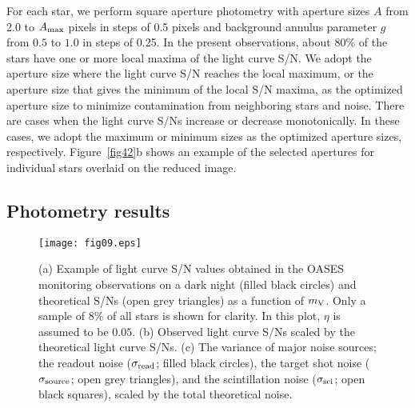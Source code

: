 \documentclass{pasj01}
\begin{document}
For each star, we perform square aperture photometry 
with aperture sizes $A$ from 2.0 to  $A_{\rm max}$ pixels in steps of 0.5 pixels
and background annulus parameter
$g$ from  $0.5$ to $1.0$ in steps of 0.25.
In the present observations, 
about 80\% of the stars have one or more local maxima of the light curve S/N.
We adopt the aperture size where the light curve S/N reaches the local maximum, 
or the aperture size that gives the minimum of the local S/N maxima, 
as the optimized aperture size to minimize contamination from neighboring stars
and noise.
There are cases when the light curve S/Ns increase or decrease monotonically.
In these cases, we adopt the maximum or minimum sizes
as the optimized aperture  sizes, respectively. 
Figure~\ref{fig42}b shows an example of the selected apertures for individual 
stars overlaid on the reduced image.


\subsection{Photometry results}
\label{subsec:photresult}

\begin{figure}[!pt]
\begin{center}
   \texttt{[image: fig09.eps]}
   \caption{(a) Example of light curve S/N values obtained 
   in the OASES monitoring observations on a dark night (filled black circles) and theoretical S/Ns 
   (open grey triangles) 
   as a function of $m_{\rm V}$.  
   Only a sample of 8\% of all stars is shown for clarity.
   In this plot, $\eta$ is assumed to be $0.05$. 
 (b) Observed light curve S/Ns scaled by the  theoretical light curve S/Ns.
 (c) The variance of major noise sources; the readout noise ($\sigma_{\rm read}$; filled black circles),
 the target shot noise ($\sigma_{\rm source}$; open grey triangles), and the scintillation noise ($\sigma_{\rm sci}$; open black squares),
 scaled by the total theoretical noise.}
   \label{fig4r3}
 \end{center}
\end{figure}
\end{document}
